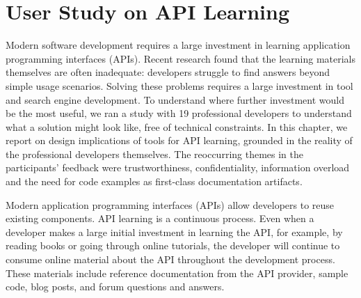 

\chapter{User Study on API Learning}
\label{the chapter on the MSR user study}

Modern software development requires a large investment in learning application programming interfaces (APIs).
%
Recent research found that the learning materials themselves are often inadequate: developers struggle to find answers beyond simple usage scenarios.
%
Solving these problems requires a large investment in tool and search engine development.
%
To understand where further investment would be the most useful, we ran a study with 19 professional developers to understand what a solution might look like, free of technical constraints. In this chapter, we report on design implications of tools for API learning, grounded in the reality of the professional developers themselves. 
The reoccurring themes in the participants' feedback were trustworthiness, confidentiality, information overload and the need for code examples as first-class documentation artifacts.

Modern application programming interfaces (APIs) allow developers to reuse existing components. API learning is a continuous process. Even when a developer makes a large initial investment in learning the API, 
for example, by reading books or going through online tutorials, 
the developer will continue to consume online material 
about the API 
throughout the development process. These materials include reference documentation from the API provider, sample code, blog posts, and forum questions and answers. 

